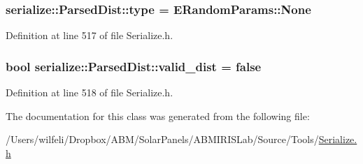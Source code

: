 \subsubsection[{type}]{ serialize\+::\+Parsed\+Dist\+::type = E\+Random\+Params\+::\+None}\label{classserialize_1_1_parsed_dist_add184f5c1c9744070ad51aa48db107f7}


Definition at line 517 of file Serialize.\+h.

\hypertarget{classserialize_1_1_parsed_dist_af3c62d6c17845cb3be62c495e4d742db}{}
\subsubsection[{valid\+\_\+dist}]{\setlength{\rightskip}{0pt plus 5cm}bool serialize\+::\+Parsed\+Dist\+::valid\+\_\+dist = false}\label{classserialize_1_1_parsed_dist_af3c62d6c17845cb3be62c495e4d742db}


Definition at line 518 of file Serialize.\+h.



The documentation for this class was generated from the following file\+:\begin{DoxyCompactItemize}
\item 
/\+Users/wilfeli/\+Dropbox/\+A\+B\+M/\+Solar\+Panels/\+A\+B\+M\+I\+R\+I\+S\+Lab/\+Source/\+Tools/\hyperlink{_serialize_8h}{Serialize.\+h}\end{DoxyCompactItemize}
